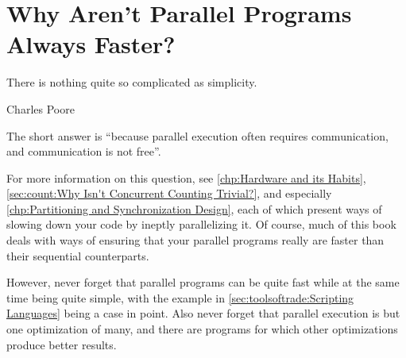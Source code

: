 
\section{Why Aren't Parallel Programs Always Faster?}
\label{sec:app:questions:Why Aren't Parallel Programs Always Faster?}
%
\epigraph{There is nothing quite so complicated as simplicity.}
	 {Charles Poore}

The short answer is ``because parallel execution often requires
communication, and communication is not free''.

For more information on this question, see
\cref{chp:Hardware and its Habits},
\cref{sec:count:Why Isn't Concurrent Counting Trivial?},
and especially
\cref{chp:Partitioning and Synchronization Design},
each of which present ways of slowing down your code by ineptly
parallelizing it.
Of course, much of this book deals with ways of ensuring that your
parallel programs really are faster than their sequential counterparts.

However, never forget that parallel programs can be quite fast while at
the same time being quite simple, with the example in
\cref{sec:toolsoftrade:Scripting Languages}
being a case in point.
Also never forget that parallel execution is but one optimization of many,
and there are programs for which other optimizations produce better results.
